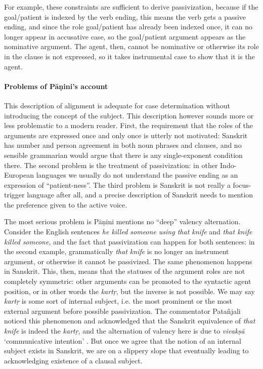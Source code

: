 \documentclass[a4paper, oneside, 12pt]{report}
\newcommand{\form}[1]{\emph{#1}}
\newcommand{\translate}[1]{`#1'}
\begin{document}
For example, these constraints are sufficient to derive passivization,
because if the goal/patient is indexed by the verb ending,
this means the verb gets a passive ending,
and since the role goal/patient has already been indexed once,
it can no longer appear in accusative case,
so the goal/patient argument appears as the nominative argument.
The agent, then, cannot be nominative or otherwise its role in the clause is not expressed,
so it takes instrumental case to show that it is the agent.

\paragraph*{Problems of Pāṇini's account}
This description of alignment is adequate for case determination without introducing the concept of the subject.
This description however sounds more or less problematic to a modern reader.
First, the requirement that the roles of the arguments are expressed once and only once is utterly not motivated:
Sanskrit has number and person agreement in both noun phrases and clauses,
and no sensible grammarian would argue that there is any single-exponent condition there.
The second problem is the treatment of passivization: 
in other Indo-European languages we usually do not understand the passive ending
as an expression of ``patient-ness''.
The third problem is Sanskrit is not really a focus-trigger language after all,
and a precise description of Sanskrit needs to mention the preference given to the active voice.

The most serious problem is Pāṇini mentions no ``deep'' valency alternation.
Consider the English sentences \form{he killed someone using that knife} 
and \form{that knife killed someone},
and the fact that passivization can happen for both sentences:
in the second example, grammatically \form{that knife} is no longer an instrument argument,
or otherwise it cannot be passivized.
The same phenomenon happens in Sanskrit.
This, then, means that the statuses of the argument roles are not completely symmetric:
other arguments can be promoted to the syntactic agent position, or in other words the \form{kartṛ},
but the inverse is not possible.
We may say \form{kartṛ} is some sort of internal subject,
i.e. the most prominent or the most external argument before possible passivization.
The commentator Patañjali noticed this phenomenon and
acknowledged that the Sanskrit equivalence of \form{that knife} is indeed the \form{kartṛ},
and the alternation of valency here is due to \form{vivakṣā} \translate{communicative intention}
\citep{keidan2017subjecthood}.
But once we agree that the notion of an internal subject exists in Sanskrit,
we are on a slippery slope that eventually leading to acknowledging 
existence of a clausal subject.
\end{document}
